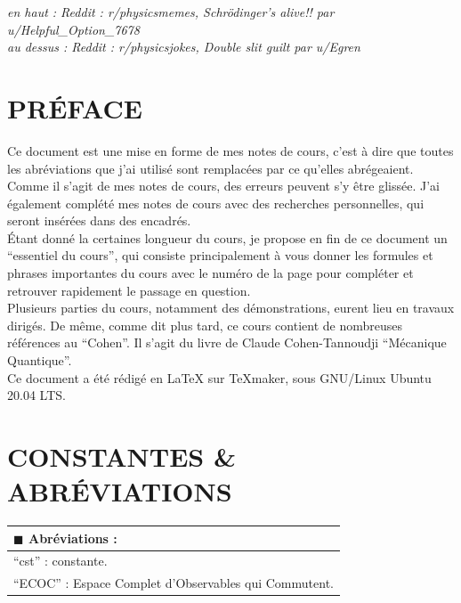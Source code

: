 \documentclass[12pt,a4paper,titlepage]{book}
\begin{document}
\textit{en haut : Reddit : r/physicsmemes, Schrödinger's alive!! par u/Helpful\_{}Option\_{}7678}\\

\textit{au dessus : Reddit : r/physicsjokes, Double slit guilt par u/Egren}
\newpage
\null
\newpage
{}
\tableofcontents
\newpage
\chapter*{PRÉFACE}

Ce document est une mise en forme de mes notes de cours, c'est à dire que toutes les abréviations que j'ai utilisé sont remplacées par ce qu'elles abrégeaient. Comme il s'agit de mes notes de cours, des erreurs peuvent s'y être glissée. J'ai également complété mes notes de cours avec des recherches personnelles, qui seront insérées dans des encadrés.\\

Étant donné la certaines longueur du cours, je propose en fin de ce document un \enquote{essentiel du cours}, qui consiste principalement à vous donner les formules et phrases importantes du cours avec le numéro de la page pour compléter et retrouver rapidement le passage en question.\\

Plusieurs parties du cours, notamment des démonstrations, eurent lieu en travaux dirigés. De même, comme dit plus tard, ce cours contient de nombreuses références au \enquote{Cohen}. Il s'agit du livre de Claude Cohen-Tannoudji \enquote{Mécanique Quantique}.\\

Ce document a été rédigé en {\LaTeX} sur TeXmaker, sous GNU/Linux Ubuntu 20.04 LTS.\\

\newpage
\chapter*{CONSTANTES \& ABRÉVIATIONS}

\begin{tabular}{|p{15cm}|}
\hline
$\blacksquare$ Abréviations :\\
\hline
\enquote{cst} : constante.\\
\enquote{ECOC} : Espace Complet d'Observables qui Commutent.\\
\hline
\end{tabular}\\
\end{document}
